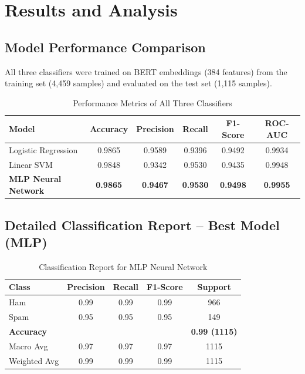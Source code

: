 \documentclass[12pt,a4paper]{article}
\begin{document}
\section{Results and Analysis}

\subsection{Model Performance Comparison}

All three classifiers were trained on BERT embeddings (384 features) from the training set (4,459 samples) and evaluated on the test set (1,115 samples).

\begin{table}[H]
\centering
\renewcommand{\arraystretch}{1.4}
\begin{tabular}{|l|c|c|c|c|c|}
\hline
\textbf{Model} & \textbf{Accuracy} & \textbf{Precision} & \textbf{Recall} & \textbf{F1-Score} & \textbf{ROC-AUC} \\
\hline
Logistic Regression     & 0.9865 & 0.9589 & 0.9396 & 0.9492 & 0.9934 \\
\hline
Linear SVM              & 0.9848 & 0.9342 & 0.9530 & 0.9435 & 0.9948 \\
\hline
\textbf{MLP Neural Network} & \textbf{0.9865} & \textbf{0.9467} & \textbf{0.9530} & \textbf{0.9498} & \textbf{0.9955} \\
\hline
\end{tabular}
\caption{Performance Metrics of All Three Classifiers}
\end{table}

\subsection{Detailed Classification Report -- Best Model (MLP)}

\begin{table}[H]
\centering
\renewcommand{\arraystretch}{1.3}
\begin{tabular}{|l|c|c|c|c|}
\hline
\textbf{Class} & \textbf{Precision} & \textbf{Recall} & \textbf{F1-Score} & \textbf{Support} \\
\hline
Ham     & 0.99 & 0.99 & 0.99 & 966 \\
Spam    & 0.95 & 0.95 & 0.95 & 149 \\
\hline
\textbf{Accuracy}       & \multicolumn{3}{c|}{}          & \textbf{0.99 (1115)} \\
\hline
Macro Avg       & 0.97 & 0.97 & 0.97 & 1115 \\
Weighted Avg    & 0.99 & 0.99 & 0.99 & 1115 \\
\hline
\end{tabular}
\caption{Classification Report for MLP Neural Network}
\end{table}
\end{document}
